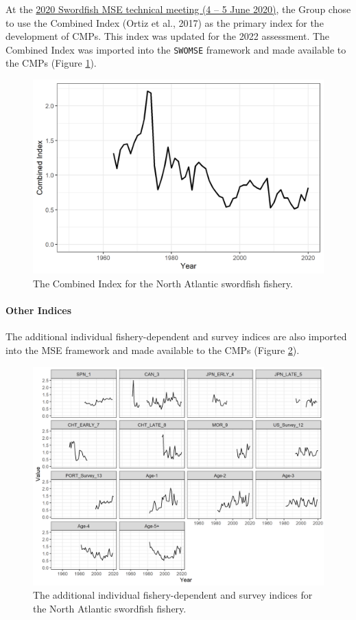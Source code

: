 \documentclass[
]{article}
\begin{document}
At the \href{../Meeting_Reports/2020_SWO_MSE_1_ENG.pdf}{2020 Swordfish MSE technical meeting (4 -- 5 June 2020)}, the Group chose to use the Combined Index (Ortiz et al., 2017) as the primary index for the development of CMPs. This index was updated for the 2022 assessment. The Combined Index was imported into the \texttt{SWOMSE} framework and made available to the CMPs (Figure \ref{fig:index-plot}).

\begin{figure}
\centering
\includegraphics{../../img/Combined_Index.png}
\caption{\label{fig:index-plot} The Combined Index for the North Atlantic swordfish fishery.}
\end{figure}

\hypertarget{other-indices}{%
\paragraph{Other Indices}\label{other-indices}}

The additional individual fishery-dependent and survey indices are also imported into the MSE framework and made available to the CMPs (Figure \ref{fig:addindex-plot}).

\begin{figure}
\centering
\includegraphics{../../img/Individual_Indices.png}
\caption{\label{fig:addindex-plot} The additional individual fishery-dependent and survey indices for the North Atlantic swordfish fishery.}
\end{figure}
\end{document}
